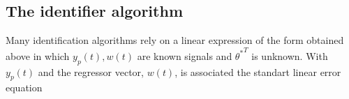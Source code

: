 \subsection{The identifier algorithm}
Many identification algorithms rely on a linear expression of the form obtained above in which $y_p(t), w(t)$ are known signals and ${\theta^*}^T$ is unknown. With $y_p(t)$ and the regressor vector, $ w(t)$, is associated the standart linear error equation
